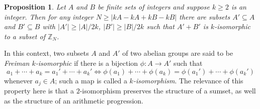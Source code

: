 \documentclass[12pt,a4paper,reqno]{amsart}
\numberwithin{equation}{section}
\theoremstyle{plain}
\newtheorem{proposition}[subsection]{Proposition}
\theoremstyle{definition}
\renewcommand{\geq}{\geqslant}
\renewcommand{\subset}{\subseteq}
\def\Z{\mathbb{Z}}
\newcommand{\Zmod}[1]{\Z_{#1}} %
\providecommand{\abs}[1]{\lvert#1\rvert}
\theoremstyle{plain}
\begin{document}
\begin{proposition}\label{prop-ruzsa}
Let $A$ and $B$ be finite sets of integers and suppose $k \geq 2$ is an integer. Then for any integer $N \geq \abs{kA-kA+kB-kB}$ there are subsets $A' \subset A$ and $B'\subset B$ with $\abs{A'} \geq \abs{A}/2k$, $\abs{B'} \geq \abs{B}/2k$ such that $A'+B'$ is $k$-isomorphic to a subset of $\Zmod{N}$.
\end{proposition}
In this context, two subsets $A$ and $A'$ of two abelian groups are said to be \emph{Freiman $k$-isomorphic} if there is a bijection $\phi : A \to A'$ such that
\[ a_1 + \cdots + a_k = a_1' + \cdots + a_k' \Longleftrightarrow \phi(a_1) + \cdots + \phi(a_k) = \phi(a_1') + \cdots + \phi(a_k') \]
whenever $a_j \in A$; such a map is called a \emph{$k$-isomorphism}. The relevance of this property here is that a $2$-isomorphism preserves the structure of a sumset, as well as the structure of an arithmetic progression.
\end{document}

